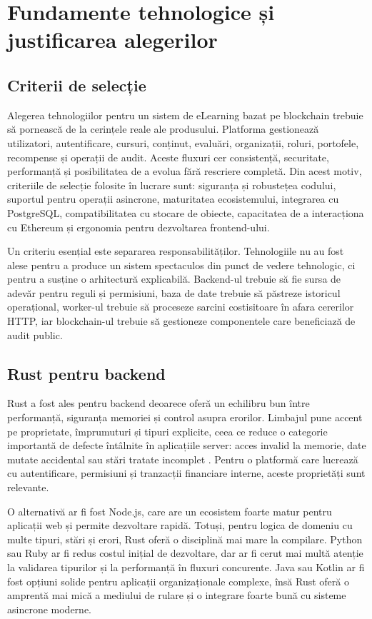 \chapter{Fundamente tehnologice și justificarea alegerilor}

\section{Criterii de selecție}
Alegerea tehnologiilor pentru un sistem de eLearning bazat pe blockchain trebuie să pornească de la cerințele reale ale produsului. Platforma gestionează utilizatori, autentificare, cursuri, conținut, evaluări, organizații, roluri, portofele, recompense și operații de audit. Aceste fluxuri cer consistență, securitate, performanță și posibilitatea de a evolua fără rescriere completă. Din acest motiv, criteriile de selecție folosite în lucrare sunt: siguranța și robustețea codului, suportul pentru operații asincrone, maturitatea ecosistemului, integrarea cu PostgreSQL, compatibilitatea cu stocare de obiecte, capacitatea de a interacționa cu Ethereum și ergonomia pentru dezvoltarea frontend-ului.

Un criteriu esențial este separarea responsabilităților. Tehnologiile nu au fost alese pentru a produce un sistem spectaculos din punct de vedere tehnologic, ci pentru a susține o arhitectură explicabilă. Backend-ul trebuie să fie sursa de adevăr pentru reguli și permisiuni, baza de date trebuie să păstreze istoricul operațional, worker-ul trebuie să proceseze sarcini costisitoare în afara cererilor HTTP, iar blockchain-ul trebuie să gestioneze componentele care beneficiază de audit public.

\section{Rust pentru backend}
Rust a fost ales pentru backend deoarece oferă un echilibru bun între performanță, siguranța memoriei și control asupra erorilor. Limbajul pune accent pe proprietate, împrumuturi și tipuri explicite, ceea ce reduce o categorie importantă de defecte întâlnite în aplicațiile server: acces invalid la memorie, date mutate accidental sau stări tratate incomplet \cite{rustBookOnline,rustProgramming}. Pentru o platformă care lucrează cu autentificare, permisiuni și tranzacții financiare interne, aceste proprietăți sunt relevante.

O alternativă ar fi fost Node.js, care are un ecosistem foarte matur pentru aplicații web și permite dezvoltare rapidă. Totuși, pentru logica de domeniu cu multe tipuri, stări și erori, Rust oferă o disciplină mai mare la compilare. Python sau Ruby ar fi redus costul inițial de dezvoltare, dar ar fi cerut mai multă atenție la validarea tipurilor și la performanță în fluxuri concurente. Java sau Kotlin ar fi fost opțiuni solide pentru aplicații organizaționale complexe, însă Rust oferă o amprentă mai mică a mediului de rulare și o integrare foarte bună cu sisteme asincrone moderne.

